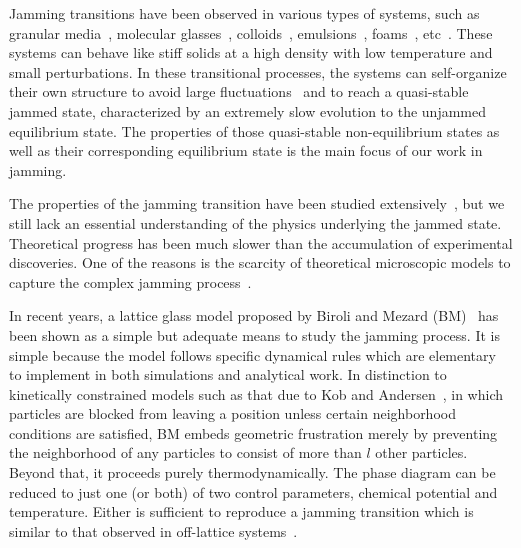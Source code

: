 Jamming transitions have been observed in various types of systems,
such as granular media~\cite{Majmudar2007}, molecular glasses~\cite{Parisi2010,Angelani2007},
colloids~\cite{Trappe2001}, emulsions~\cite{Zhang2005}, foams~\cite{Berthier2011,DaCruz2002},
etc~\cite{Liu2010,van2010}. These systems can behave like stiff solids
at a high density with low temperature and small perturbations. In
these transitional processes, the systems can self-organize their
own structure to avoid large fluctuations~\cite{Berthier2011} and
to reach a quasi-stable jammed state, characterized by an extremely
slow evolution to the unjammed equilibrium state. The properties of
those quasi-stable non-equilibrium states as well as their corresponding
equilibrium state is the main focus of our work in jamming. 


The properties of the jamming transition have been studied 
extensively~\cite{Biroli2007,Majmudar2007,Liu2010}, but we still lack an essential
understanding of the physics underlying the jammed state. Theoretical
progress has been much slower than the accumulation of experimental
discoveries. One of the reasons is the scarcity of theoretical microscopic
models to capture the complex jamming process~\cite{Krzakala2008,Jacquin2011}. 

In recent years, a lattice glass model proposed by Biroli and Mezard
(BM)~\cite{Biroli02} has been shown as a simple but adequate means
to study the jamming process. It is simple because the model follows
specific dynamical rules which are elementary to implement in both
simulations and analytical work. In distinction to kinetically constrained
models such as that due to Kob and Andersen~\cite{Kob93}, in which
particles are blocked from leaving a position unless certain neighborhood
conditions are satisfied, BM embeds geometric frustration merely by
preventing the neighborhood of any particles to consist of more than
$l$ other particles. Beyond that, it proceeds purely thermodynamically.
The phase diagram can be reduced to just one (or both) of two control
parameters, chemical potential and temperature. Either is sufficient
to reproduce a jamming transition which is similar to that observed
in off-lattice systems~\cite{Biroli02}. 

